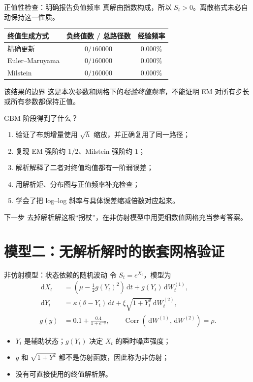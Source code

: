 \documentclass[aspectratio=169,10pt,fontset=none]{ctexbeamer}
\newcommand{\dd}{\,\mathrm{d}}
\begin{document}
\begin{frame}{正值性检查：明确报告负值频率}
  真解由指数构成，所以 $S_t>0$。离散格式未必自动保持这一性质。
  \begin{center}
    \begin{tabular}{lcc}
      \toprule
      终值生成方式 & 负终值数 / 总路径数 & 经验频率 \\
      \midrule
      精确更新 & $0/160000$ & $0.000\%$ \\
      Euler--Maruyama & $0/160000$ & $0.000\%$ \\
      Milstein & $0/160000$ & $0.000\%$ \\
      \bottomrule
    \end{tabular}
  \end{center}
  \begin{alertblock}{该结果的边界}
    这是本次参数和网格下的\emph{经验终值频率}，不能证明 EM 对所有步长或所有参数都保持正值。
  \end{alertblock}
\end{frame}

\begin{frame}{GBM 阶段得到了什么？}
  \begin{enumerate}
    \item 验证了布朗增量使用 $\sqrt h$ 缩放，并正确复用了同一路径；
    \item 复现 EM 强阶约 $1/2$、Milstein 强阶约 $1$；
    \item 解析解释了二者对终值均值都有一阶弱误差；
    \item 用解析矩、分布图与正值频率补充检查；
    \item 学会了把 log--log 斜率与具体误差缩减倍数对应起来。
  \end{enumerate}
  \begin{block}{下一步}
    去掉解析解这根“拐杖”，在非仿射模型中用更细数值网格充当参考答案。
  \end{block}
\end{frame}

\section{模型二：无解析解时的嵌套网格验证}

\begin{frame}{非仿射模型：状态依赖的随机波动}
  令 $S_t=e^{X_t}$，模型为
  \begin{align*}
    \dd X_t&=\left(\mu-\frac12g(Y_t)^2\right)\dd t+g(Y_t)\dd W_t^{(1)},\\
    \dd Y_t&=\kappa(\theta-Y_t)\dd t
      +\xi\sqrt{1+Y_t^2}\dd W_t^{(2)},\\
    g(y)&=0.1+\frac{0.4}{1+e^{-y}},
    \qquad \operatorname{Corr}(\dd W^{(1)},\dd W^{(2)})=\rho.
  \end{align*}
  \begin{itemize}
    \item $Y_t$ 是辅助状态；$g(Y_t)$ 决定 $X_t$ 的瞬时噪声强度；
    \item $g$ 和 $\sqrt{1+Y^2}$ 都不是仿射函数，因此称为非仿射；
    \item 没有可直接使用的终值解析解。
  \end{itemize}
\end{frame}
\end{document}

